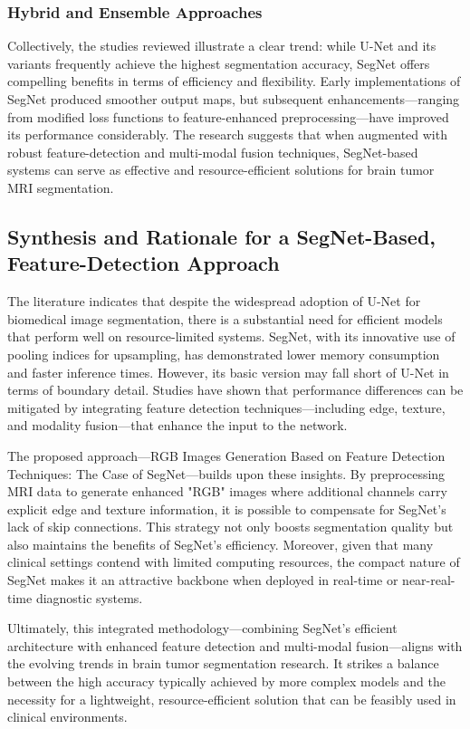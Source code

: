 \subsubsection{Hybrid and Ensemble Approaches}
\label{sec:ensemble_segnet}
Collectively, the studies reviewed illustrate a clear trend: while U-Net and its variants frequently achieve the highest segmentation accuracy, SegNet offers compelling benefits in terms of efficiency and flexibility. Early implementations of SegNet produced smoother output maps, but subsequent enhancements—ranging from modified loss functions to feature-enhanced preprocessing—have improved its performance considerably. The research suggests that when augmented with robust feature-detection and multi-modal fusion techniques, SegNet-based systems can serve as effective and resource-efficient solutions for brain tumor MRI segmentation.

\subsection{Synthesis and Rationale for a SegNet-Based, Feature-Detection Approach}
\label{sec:synthesis_rationale}
The literature indicates that despite the widespread adoption of U-Net for biomedical image segmentation, there is a substantial need for efficient models that perform well on resource-limited systems. SegNet, with its innovative use of pooling indices for upsampling, has demonstrated lower memory consumption and faster inference times. However, its basic version may fall short of U-Net in terms of boundary detail. Studies have shown that performance differences can be mitigated by integrating feature detection techniques—including edge, texture, and modality fusion—that enhance the input to the network.

The proposed approach—RGB Images Generation Based on Feature Detection Techniques: The Case of SegNet—builds upon these insights. By preprocessing MRI data to generate enhanced "RGB" images where additional channels carry explicit edge and texture information, it is possible to compensate for SegNet's lack of skip connections. This strategy not only boosts segmentation quality but also maintains the benefits of SegNet's efficiency. Moreover, given that many clinical settings contend with limited computing resources, the compact nature of SegNet makes it an attractive backbone when deployed in real-time or near-real-time diagnostic systems.

Ultimately, this integrated methodology—combining SegNet's efficient architecture with enhanced feature detection and multi-modal fusion—aligns with the evolving trends in brain tumor segmentation research. It strikes a balance between the high accuracy typically achieved by more complex models and the necessity for a lightweight, resource-efficient solution that can be feasibly used in clinical environments.

